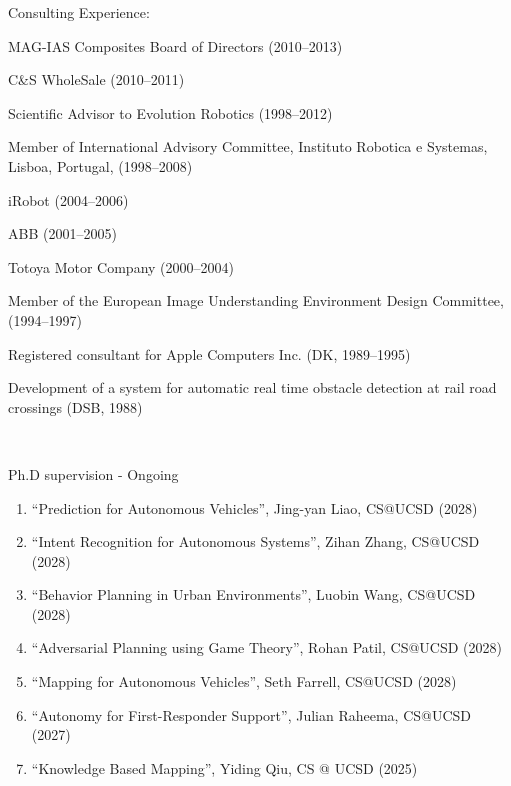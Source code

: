 \documentclass{article}
\newenvironment{sublist}{%
  \begin{list}{}{%
      \setlength{\itemsep}{0em}\setlength{\parsep}{0em}%
      \setlength{\topsep}{0em}\setlength{\parskip}{0em}%
    }%
}%
{ \end{list} }
\begin{document}
\begin{cv}
\begin{cvlist}{Consulting Experience:}
\begin{sublist}
			\item MAG-IAS Composites Board of Directors (2010--2013)
			\item C\&S WholeSale (2010--2011)
			\item Scientific Advisor to Evolution Robotics (1998--2012)
			\item Member of International Advisory Committee, Instituto Robotica e Systemas, Lisboa, Portugal, (1998--2008)
			\item iRobot (2004--2006)
			\item ABB (2001--2005)
			\item Totoya Motor Company (2000--2004)
			\item Member of the European Image Understanding Environment Design	Committee, (1994--1997)
			\item Registered consultant for Apple Computers Inc. (DK, 1989--1995)
			\item Development of a system for automatic real time obstacle	detection at rail road crossings (DSB, 1988)
		\end{sublist}
	\end{cvlist}



	\begin{cvlist}{~}

		\item[Ph.D supervision - Ongoing]\ \\
		\begin{enumerate}
			\item ``Prediction for Autonomous Vehicles'', Jing-yan Liao, CS@UCSD (2028)
			\item ``Intent Recognition for Autonomous Systems'', Zihan Zhang, CS@UCSD (2028)
			\item ``Behavior Planning in Urban Environments'', Luobin Wang, CS@UCSD (2028)
			\item ``Adversarial Planning using Game Theory'', Rohan Patil, CS@UCSD (2028)
			\item ``Mapping for Autonomous Vehicles'', Seth Farrell, CS@UCSD (2028)
			\item ``Autonomy for First-Responder Support'', Julian Raheema, CS@UCSD (2027)
			\item ``Knowledge Based Mapping'', Yiding Qiu, CS @ UCSD (2025)
		\end{enumerate}


\end{cvlist}
\end{cv}
\end{document}
